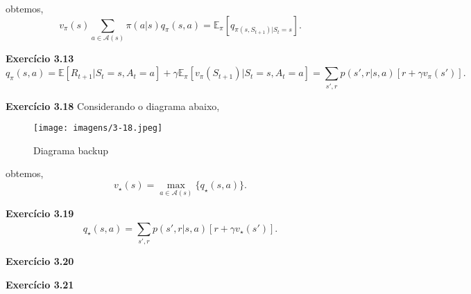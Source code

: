 \documentclass{article}
\begin{document}
obtemos,
\[
  v_{\pi}(s) \sum_{a \in \mathcal{A}(s)}^{} \pi(a|s) q_{\pi}(s,a) = \mathbb{E}_{\pi}[q_{\pi(s,S_{t+1})| S_t=s}]
.\] 
\vspace{5mm}

\textbf{Exercício 3.13} \[
  q_{\pi}(s,a) = \mathbb{E}[R_{t+1}|S_t=s,A_t=a] + \gamma \mathbb{E}_{\pi}[v_{\pi}(S_{t+1}) | S_t=s, A_t = a] = \sum_{s',r}^{} p(s',r|s,a)[r+\gamma v_{\pi}(s')]
.\] 
\vspace{5mm}



\textbf{Exercício 3.18} Considerando o diagrama abaixo,
\begin{figure}[htpb]
  \centering
  \texttt{[image: imagens/3-18.jpeg]}
  \caption{Diagrama backup}
  \label{fig:imagens-3-12-jpeg}
\end{figure}

obtemos,
\[
  v_{\star}(s)=\max_{a \in \mathcal{A}(s)} \{q_{\star}(s,a)\}
.\] 

\vspace{5mm}

\textbf{Exercício 3.19} \[
  q_{\star}(s,a)=\sum_{s',r}^{} p(s',r|s,a)[r+\gamma v_{\star}(s')]
.\] 
\vspace{5mm}


\textbf{Exercício 3.20} 
\vspace{5mm}

\textbf{Exercício 3.21} 
\vspace{5mm}
\end{document}
